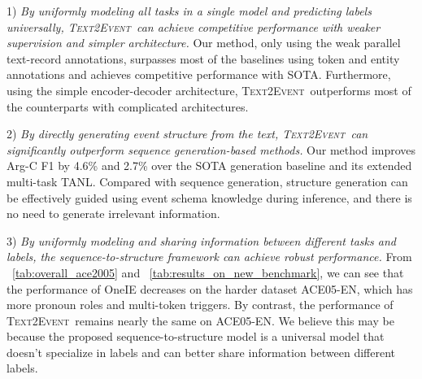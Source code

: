 \documentclass[11pt,a4paper]{article}
\newcommand\modelname{\textsc{Text2Event}}
\begin{document}
1) \textit{By uniformly modeling all tasks in a single model and predicting labels universally, \modelname\, can achieve competitive performance with weaker supervision and simpler architecture.}
Our method, only using the weak parallel text-record annotations, surpasses most of the baselines using token and entity annotations and achieves competitive performance with SOTA.
Furthermore, using the simple encoder-decoder architecture, \modelname\, outperforms most of the counterparts with complicated architectures.

2) \textit{By directly generating event structure from the text, \modelname\, can significantly outperform sequence generation-based methods.}
Our method improves Arg-C F1 by 4.6\% and 2.7\% over the SOTA generation baseline and its extended multi-task TANL.
Compared with sequence generation, structure generation can be effectively guided using event schema knowledge during inference, and there is no need to generate irrelevant information.

3) \textit{By uniformly modeling and sharing information between different tasks and labels, the sequence-to-structure framework can achieve robust performance. }
From \tablename~\ref{tab:overall_ace2005} and \tablename~\ref{tab:results_on_new_benchmark}, we can see that the performance of OneIE decreases on the harder dataset ACE05-EN, which has more pronoun roles and multi-token triggers.
By contrast, the performance of \modelname\, remains nearly the same on ACE05-EN.
We believe this may be because the proposed sequence-to-structure model is a universal model that doesn't specialize in labels and can better share information between different labels.
\end{document}
